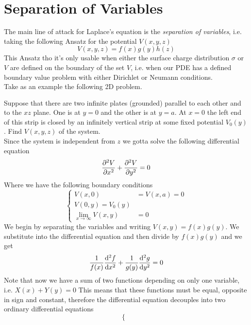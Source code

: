 \documentclass[../electromagnetism]{subfiles}
\begin{document}
\section{Separation of Variables}
The main line of attack for Laplace's equation is the \textit{separation of variables}, i.e. taking the following Ansatz for the potential $V(x,y,z)$
\begin{equation*}
	V(x,y,z)=f(x)g(y)h(z)
\end{equation*}
This Ansatz tho it's only usable when either the surface charge distribution $\sigma$ or $V$ are defined on the boundary of the set $V$, i.e. when our PDE has a defined boundary value problem with either Dirichlet or Neumann conditions.\\
Take as an example the following 2D problem.
\begin{eg}
	Suppose that there are two infinite plates (grounded) parallel to each other and to the $xz$ plane. One is at $y=0$ and the other is at $y=a$. At $x=0$ the left end of this strip is closed by an infinitely vertical strip at some fixed potential $V_0(y)$. Find $V(x,y,z)$ of the system.\\
	Since the system is independent from $z$ we gotta solve the following differential equation
	\begin{equation*}
		\pdv[2]{V}{x}+\pdv[2]{V}{y}=0
	\end{equation*}
	Where we have the following boundary conditions
	\begin{equation*}
		\left\{ \begin{aligned}
				V(x,0)&= V(x,a)=0\\
				V(0,y)=V_0(y)\\
				\lim_{x\to\infty}V(x,y)&=0
		\end{aligned}\right.
	\end{equation*}
	We begin by separating the variables and writing $V(x,y)=f(x)g(y)$. We substitute into the differential equation and then divide by $f(x)g(y)$ and we get
	\begin{equation*}
		\frac{1}{f(x)}\dv[2]{f}{x}+\frac{1}{g(y)}\dv[2]{g}{y}=0
	\end{equation*}
	Note that now we have a sum of two functions depending on only one variable, i.e. $X(x)+Y(y)=0$ This means that these functions must be equal, opposite in sign and constant, therefore the differential equation decouples into two ordinary differential equations
	\begin{equation*}
		\left\{ \begin{aligned}

\end{aligned}
\end{equation*}
\end{eg}
\end{document}
